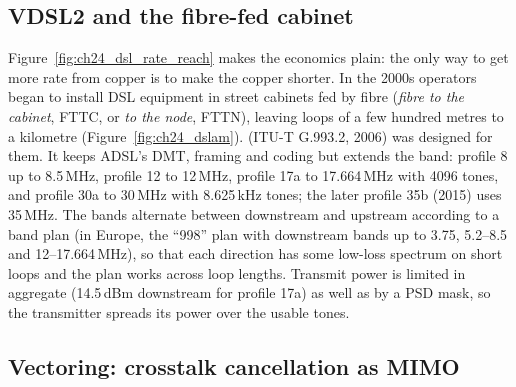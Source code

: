 
\subsection{VDSL2 and the fibre-fed cabinet}

Figure~\ref{fig:ch24_dsl_rate_reach} makes the economics plain: the only way to get more rate from
copper is to make the copper shorter. In the 2000s operators began to install DSL equipment in
street cabinets fed by fibre (\emph{fibre to the cabinet}, FTTC, or \emph{to the node}, FTTN), leaving
loops of a few hundred metres to a kilometre (Figure~\ref{fig:ch24_dslam}).  (ITU-T
G.993.2, 2006) was designed for them. It keeps ADSL's DMT, framing and coding but extends the band:
profile 8 up to 8.5\,MHz, profile 12 to 12\,MHz, profile 17a to 17.664\,MHz with 4096 tones, and
profile 30a to 30\,MHz with 8.625\,kHz tones; the later profile 35b (2015) uses 35\,MHz. The bands
alternate between downstream and upstream according to a band plan (in Europe, the ``998'' plan with
downstream bands up to 3.75, 5.2--8.5 and 12--17.664\,MHz), so that each direction has some
low-loss spectrum on short loops and the plan works across loop lengths. Transmit power is limited
in aggregate (14.5\,dBm downstream for profile 17a) as well as by a PSD mask, so the transmitter
spreads its power over the usable tones.




\subsection{Vectoring: crosstalk cancellation as MIMO}
\label{sec:ch24:vectoring}

